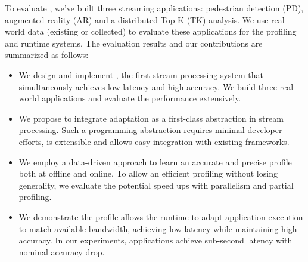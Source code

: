To evaluate \sysname{}, we've built three streaming applications: pedestrian
detection (PD), augmented reality (AR) and a distributed Top-K (TK) analysis. We
use real-world data (existing or collected) to evaluate these applications for
the profiling and runtime systems. The evaluation results and our contributions
are summarized as follows:

\begin{itemize}[leftmargin=16pt]
\item We design and implement \sysname{}, the first stream processing system
  that simultaneously achieves low latency and high accuracy. We build three
  real-world applications and evaluate the performance extensively.
\item We propose to integrate adaptation as a first-class abstraction in stream
  processing. Such a programming abstraction requires minimal developer efforts,
  is extensible and allows easy integration with existing frameworks.
\item We employ a data-driven approach to learn an accurate and precise profile
  both at offline and online. To allow an efficient profiling without losing
  generality, we evaluate the potential speed ups with parallelism and partial
  profiling.
\item We demonstrate the profile allows the runtime to adapt application
  execution to match available bandwidth, achieving low latency while
  maintaining high accuracy. In our experiments, \sysname{} applications achieve
  sub-second latency with nominal accuracy drop.
\end{itemize}



